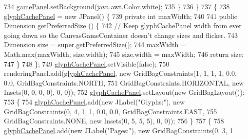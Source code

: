 \begin{DoxyCode}
734                     \mbox{\hyperlink{classorg_1_1newdawn_1_1slick_1_1tools_1_1hiero_1_1_hiero_a2ce748cacd6def18f0e72fc5a139518c}{gamePanel}}.setBackground(java.awt.Color.white);
735                 \}
736             \}
737             \{
738                 \mbox{\hyperlink{classorg_1_1newdawn_1_1slick_1_1tools_1_1hiero_1_1_hiero_a2a248f40f119ae31da5353e42be42662}{glyphCachePanel}} = \textcolor{keyword}{new} JPanel() \{
739                     \textcolor{keyword}{private} \textcolor{keywordtype}{int} maxWidth;
740 
741                     \textcolor{keyword}{public} Dimension getPreferredSize () \{
742                         \textcolor{comment}{// Keep glyphCachePanel width from ever going down so the CanvasGameContainer
       doesn't change sizes and flicker.}
743                         Dimension size = super.getPreferredSize();
744                         maxWidth = Math.max(maxWidth, size.width);
745                         size.width = maxWidth;
746                         \textcolor{keywordflow}{return} size;
747                     \}
748                 \};
749                 \mbox{\hyperlink{classorg_1_1newdawn_1_1slick_1_1tools_1_1hiero_1_1_hiero_a2a248f40f119ae31da5353e42be42662}{glyphCachePanel}}.setVisible(\textcolor{keyword}{false});
750                 renderingPanel.add(\mbox{\hyperlink{classorg_1_1newdawn_1_1slick_1_1tools_1_1hiero_1_1_hiero_a2a248f40f119ae31da5353e42be42662}{glyphCachePanel}}, \textcolor{keyword}{new} GridBagConstraints(1, 1, 1, 1, 0.0, 
      0.0, GridBagConstraints.NORTH,
751                     GridBagConstraints.HORIZONTAL, \textcolor{keyword}{new} Insets(0, 0, 0, 0), 0, 0));
752                 \mbox{\hyperlink{classorg_1_1newdawn_1_1slick_1_1tools_1_1hiero_1_1_hiero_a2a248f40f119ae31da5353e42be42662}{glyphCachePanel}}.setLayout(\textcolor{keyword}{new} GridBagLayout());
753                 \{
754                     \mbox{\hyperlink{classorg_1_1newdawn_1_1slick_1_1tools_1_1hiero_1_1_hiero_a2a248f40f119ae31da5353e42be42662}{glyphCachePanel}}.add(\textcolor{keyword}{new} JLabel(\textcolor{stringliteral}{"Glyphs:"}), \textcolor{keyword}{new} GridBagConstraints(0, 4, 
      1, 1, 0.0, 0.0, GridBagConstraints.EAST,
755                         GridBagConstraints.NONE, \textcolor{keyword}{new} Insets(0, 5, 5, 5), 0, 0));
756                 \}
757                 \{
758                     \mbox{\hyperlink{classorg_1_1newdawn_1_1slick_1_1tools_1_1hiero_1_1_hiero_a2a248f40f119ae31da5353e42be42662}{glyphCachePanel}}.add(\textcolor{keyword}{new} JLabel(\textcolor{stringliteral}{"Pages:"}), \textcolor{keyword}{new} GridBagConstraints(0, 3, 1

\end{DoxyCode}
